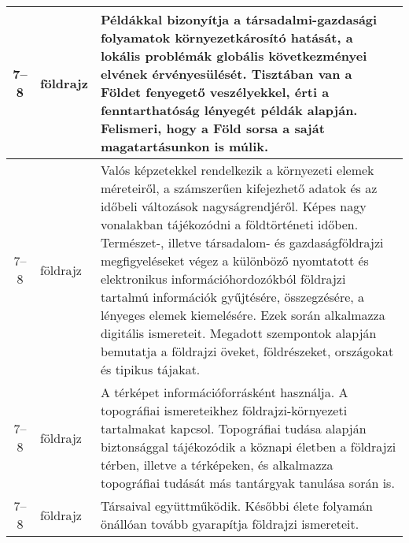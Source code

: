 \begin{small}
\begin{longtable}{c | p{2cm} |  p{11cm} }
              7--8 & földrajz & Példákkal bizonyítja a társadalmi-gazdasági folyamatok környezetkárosító hatását, a lokális problémák globális következményei elvének érvényesülését. Tisztában van a Földet fenyegető veszélyekkel, érti a fenntarthatóság lényegét példák alapján. Felismeri, hogy a Föld sorsa a saját magatartásunkon is múlik. \\ \hline
              7--8 & földrajz & Valós képzetekkel rendelkezik a környezeti elemek méreteiről, a számszerűen kifejezhető adatok és az időbeli változások nagyságrendjéről. Képes nagy vonalakban tájékozódni a földtörténeti időben. Természet-, illetve társadalom- és gazdaságföldrajzi megfigyeléseket végez a különböző nyomtatott és elektronikus információhordozókból földrajzi tartalmú információk gyűjtésére, összegzésére, a lényeges elemek kiemelésére. Ezek során alkalmazza digitális ismereteit. Megadott szempontok alapján bemutatja a földrajzi öveket, földrészeket, országokat és tipikus tájakat. \\ \hline
              7--8 & földrajz & A térképet információforrásként használja. A topográfiai ismereteikhez földrajzi-környezeti tartalmakat kapcsol. Topográfiai tudása alapján biztonsággal tájékozódik a köznapi életben a földrajzi térben, illetve a térképeken, és alkalmazza topográfiai tudását más tantárgyak tanulása során is. \\ \hline
              7--8 & földrajz & Társaival együttműködik. Későbbi élete folyamán önállóan tovább gyarapítja földrajzi ismereteit. \\ \hline
      \end{longtable}
\end{small}


